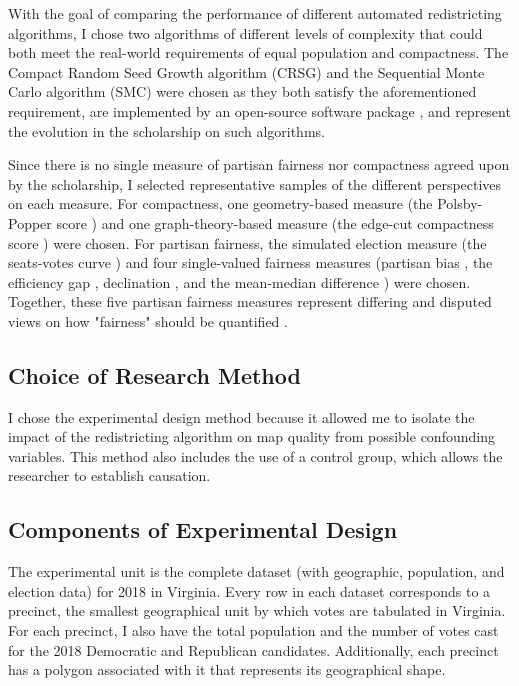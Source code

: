 With the goal of comparing the performance of different automated redistricting algorithms, I chose two algorithms of different levels of complexity that could both meet the real-world requirements of equal population and compactness. The Compact Random Seed Growth algorithm (CRSG) \parencite{chen2013} and the Sequential Monte Carlo algorithm (SMC) \parencite{mccartan2020} were chosen as they both satisfy the aforementioned requirement, are implemented by an open-source software package \parencite{fifield2020d}, and represent the evolution in the scholarship on such algorithms. 

Since there is no single measure of partisan fairness nor compactness agreed upon by the scholarship, I selected representative samples of the different perspectives on each measure. For compactness, one geometry-based measure (the Polsby-Popper score \parencite{polsby1991}) and one graph-theory-based measure (the edge-cut compactness score \parencite{dube2016}) were chosen. For partisan fairness, the simulated election measure (the seats-votes curve \parencite{tufte1973}) and four single-valued fairness measures (partisan bias \parencite{katz2020}, the efficiency gap \parencite{stephanopoulos2015}, declination \parencite{warrington2018}, and the mean-median difference \parencite{mcdonald2015}) were chosen. Together, these five partisan fairness measures represent differing and disputed views on how "fairness" should be quantified \parencite{katz2020}. 

\subsection{Choice of Research Method}

I chose the experimental design method because it allowed me to isolate the impact of the redistricting algorithm on map quality from possible confounding variables. This method also includes the use of a control group, which allows the researcher to establish causation. 

\subsection{Components of Experimental Design}

The experimental unit is the complete dataset (with geographic, population, and election data) for 2018 in Virginia. Every row in each dataset corresponds to a precinct, the smallest geographical unit by which votes are tabulated in Virginia. For each precinct, I also have the total population and the number of votes cast for the 2018 Democratic and Republican candidates. Additionally, each precinct has a polygon associated with it that represents its geographical shape.

